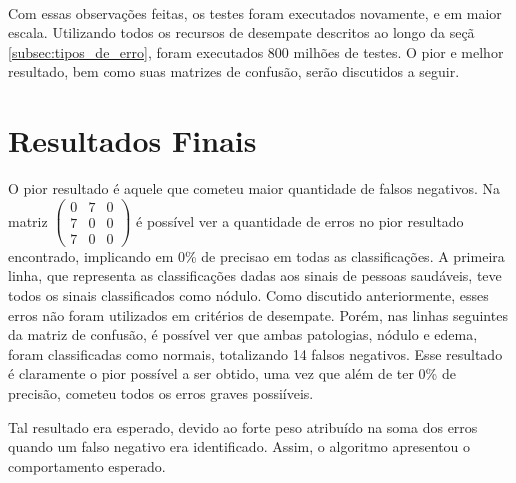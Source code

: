\documentclass[a4paper,12pt,oneside]{report}
\begin{document}
\\
\par Com essas observa\c{c}\~{o}es feitas, os testes foram executados novamente, e em maior escala. Utilizando todos os recursos de desempate descritos ao longo da se\c{c}\~{a} \ref{subsec:tipos_de_erro}, foram executados 800 milh\~{o}es de testes. O pior e melhor resultado, bem como suas matrizes de confus\~{a}o, ser\~{a}o discutidos a seguir. 
\section{Resultados Finais}
\hspace*{15pt} O pior resultado \'{e} aquele que cometeu maior quantidade de falsos negativos. Na matriz 
$
\left(\begin{smallmatrix}
0 & 7 & 0 \\
7 & 0 & 0 \\
7 & 0 & 0 
\end{smallmatrix}\right)
$
\'{e} poss\'{i}vel ver a quantidade de erros no pior resultado encontrado, implicando em 0\% de precisao em todas as classifica\c{c}\~{o}es. A primeira linha, que representa as classifica\c{c}\~{o}es dadas aos sinais de pessoas saud\'{a}veis, teve todos os sinais classificados como n\'{o}dulo. Como discutido anteriormente, esses erros n\~{a}o foram utilizados em crit\'{e}rios de desempate. Por\'{e}m, nas linhas seguintes da matriz de confus\~{a}o, \'{e} poss\'{i}vel ver que ambas patologias, n\'{o}dulo e edema, foram classificadas como normais, totalizando 14 falsos negativos. Esse resultado \'{e} claramente o pior poss\'{i}vel a ser obtido, uma vez que al\'{e}m de ter 0\% de precis\~{a}o, cometeu todos os erros graves possi\'{i}veis. 
\\
\par Tal resultado era esperado, devido ao forte peso atribu\'{i}do na soma dos erros quando um falso negativo era identificado. Assim, o algoritmo apresentou o comportamento esperado. 
\end{document}
